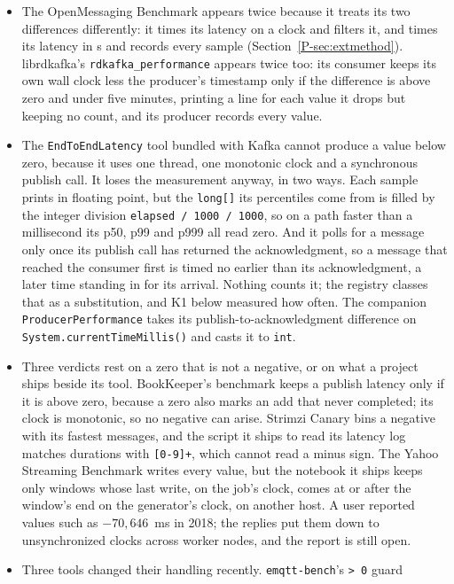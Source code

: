 \documentclass[10pt,journal,onecolumn]{IEEEtran}
\newcommand{\kafka}{Kafka}
\begin{document}
\begin{itemize}
\item The OpenMessaging Benchmark appears twice because it treats its two differences differently: it
times its \ombGuardedPath{} latency on a \ombGuardedClock{} clock and filters it, and times its
\ombUnguardedPath{} latency in \ombUnguardedClock{}s and records every sample
(Section~\ref{P-sec:extmethod}). librdkafka's \texttt{rdkafka\_performance} appears twice too: its
consumer keeps its own wall clock less the producer's timestamp only if the difference is above zero
and under five minutes, printing a line for each value it drops but keeping no count, and its
producer records every value.
\item The \texttt{EndToEndLatency} tool bundled with \kafka{} cannot produce a value below zero,
because it uses one thread, one monotonic clock and a synchronous publish call. It loses the
measurement anyway, in two ways. Each sample prints in floating point, but the \texttt{long[]} its
percentiles come from is filled by the integer division \texttt{elapsed / 1000 / 1000}, so on a
path faster than a millisecond its p50, p99 and p999 all read zero. And it polls for a message only
once its publish call has returned the acknowledgment, so a message that reached the consumer first
is timed no earlier than its acknowledgment, a later time standing in for its arrival. Nothing
counts it; the registry classes that as a substitution, and K1 below measured how often. The companion
\texttt{ProducerPerformance} takes its publish-to-acknowledgment difference on
\texttt{System.currentTimeMillis()} and casts it to \texttt{int}.
\item Three verdicts rest on a zero that is not a negative, or on what a project ships beside its
tool. BookKeeper's benchmark keeps a publish latency only if it is above zero, because a zero also
marks an add that never completed; its clock is monotonic, so no negative can arise. Strimzi Canary
bins a negative with its fastest messages, and the script it ships to read its latency log matches
durations with \texttt{[0-9]+}, which cannot read a minus sign. The Yahoo Streaming Benchmark writes
every value, but the notebook it ships keeps only windows whose last write, on the job's clock,
comes at or after the window's end on the generator's clock, on another host. A user reported values such as $-70{,}646$~ms in 2018; the replies put them down to
unsynchronized clocks across worker nodes, and the report is still open.
\item Three tools changed their handling recently. \texttt{emqtt-bench}'s \texttt{> 0} guard

\end{itemize}
\end{document}
